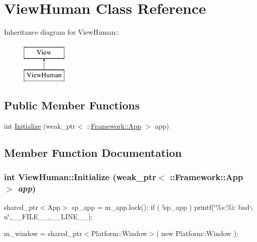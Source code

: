 \hypertarget{classViewHuman}{
\section{ViewHuman Class Reference}
\label{classViewHuman}
}
Inheritance diagram for ViewHuman::\begin{figure}[H]
\begin{center}
\leavevmode
\includegraphics[height=2cm]{classViewHuman}
\end{center}
\end{figure}
\subsection*{Public Member Functions}
\begin{DoxyCompactItemize}
\item 
int \hyperlink{classViewHuman_adfc8ef83823973906a86108130138474}{Initialize} (weak\_\-ptr$<$ ::\hyperlink{classFramework_1_1App}{Framework::App} $>$ app)
\end{DoxyCompactItemize}


\subsection{Member Function Documentation}
\hypertarget{classViewHuman_adfc8ef83823973906a86108130138474}{
\subsubsection[{Initialize}]{\setlength{\rightskip}{0pt plus 5cm}int ViewHuman::Initialize (weak\_\-ptr$<$ ::{\bf Framework::App} $>$ {\em app})}}
\label{classViewHuman_adfc8ef83823973906a86108130138474}


shared\_\-ptr$<$App$>$ sp\_\-app = m\_\-app.lock(); if ( !sp\_\-app ) printf(\char`\"{}\%s:\%i: bad$\backslash$n\char`\"{},\_\-\_\-FILE\_\-\_\-,\_\-\_\-LINE\_\-\_\-);

m\_\-window = shared\_\-ptr$<$Platform::Window$>$( new Platform::Window );

